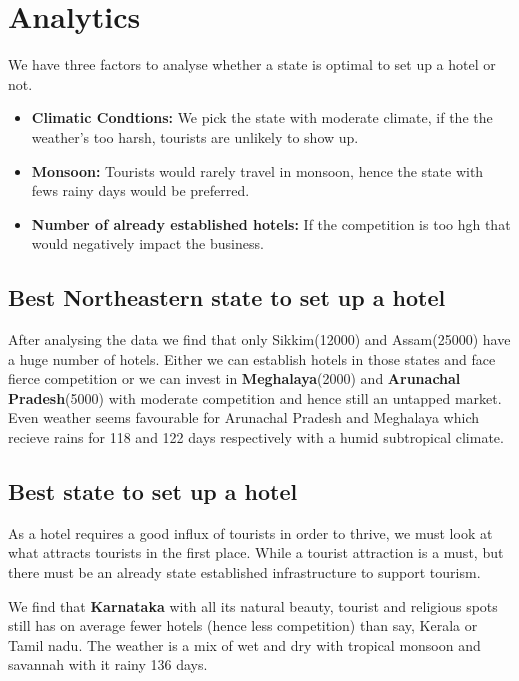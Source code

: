 \documentclass{report}
\begin{document}
 \section{Analytics}
 We have three factors to analyse whether a state is optimal to set up a hotel or not.
 \begin{itemize}
 \item \textbf{Climatic Condtions:} We pick the state with moderate climate, if the the weather's too harsh, tourists are unlikely to show up.
 \item \textbf{Monsoon:} Tourists would rarely travel in monsoon, hence the state with fews rainy days would be preferred.
 \item \textbf{Number of already established hotels:} If the competition is too hgh that would negatively impact the business.
 \end{itemize}
 \subsection{Best Northeastern state to set up a hotel}

 After analysing the data we find that only Sikkim(12000) and Assam(25000) have a huge number of hotels. Either we can establish hotels in those states and face fierce competition or we can invest in \textbf{Meghalaya}(2000) and \textbf{Arunachal Pradesh}(5000) with moderate competition and hence still an untapped market.
Even weather seems favourable for Arunachal Pradesh and Meghalaya which recieve rains for 118 and 122 days respectively with a humid subtropical climate.
 \subsection{Best state to set up a hotel}
 As a hotel requires a good influx of tourists in order to thrive, we must look at what attracts tourists in the first place. While a tourist attraction is a must, but there must be an already state established infrastructure to support tourism.

 We find that \textbf{Karnataka} with all its natural beauty, tourist and religious spots still has on average fewer hotels (hence less competition) than say, Kerala or Tamil nadu. The weather is a mix of wet and dry with tropical monsoon and savannah with it rainy 136 days.
\end{document}
